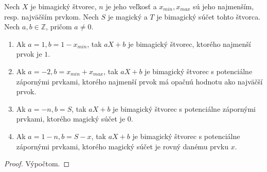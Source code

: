 \begin{theorem}
\label{5x5bimagic1}
Nech $X$ je bimagický štvorec, $n$ je jeho veľkosť a $x_{min}, x_{max}$ sú jeho najmenším, resp. najväčším prvkom. Nech $S$ je magický a $T$ je bimagický súčet tohto štvorca. Nech $a,b \in \mathbb{Z}$, pričom $a \neq 0$.
\begin{enumerate}
\item Ak $a = 1, b = 1 - x_{min}$, tak $aX+b$ je bimagický štvorec, ktorého najmenší prvok je $1$.
\item Ak $a = -2, b = x_{min} + x_{max}$, tak $aX+b$ je bimagický štvorec s potenciálne zápornými prvkami, ktorého najmenší prvok má opačnú hodnotu ako najväčší prvok.
\item Ak $a = -n, b = S$, tak $aX+b$ je bimagický štvorec s potenciálne zápornými prvkami, ktorého magický súčet je $0$.
\item Ak $a = 1-n, b = S-x$, tak $aX+b$ je bimagický štvorec s potenciálne zápornými prvkami, ktorého magický súčet je rovný danému prvku $x$.
\end{enumerate}
\end{theorem}

\begin{proof}
Výpočtom.
\end{proof}



